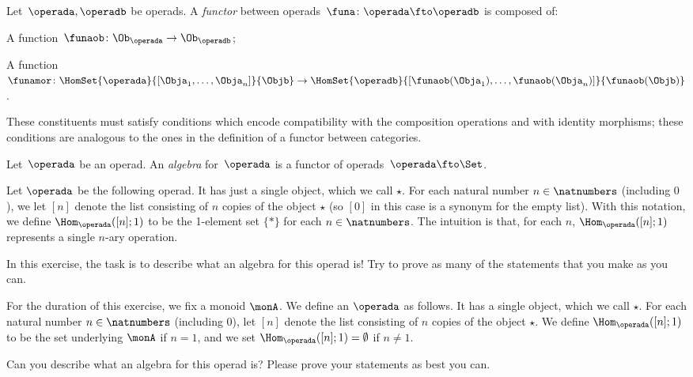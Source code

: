 \begin{ctdefinition}
  \label{def:functors_operads}
  Let~$\operada,\operadb$ be operads. A \emph{functor} between operads~$\funa\colon \operada \fto \operadb$  is composed of:
  \begin{compactenum}
    \item A function~$\funaob\colon \Ob_\operada\to \Ob_\operadb$;
    \item A function~$\funamor\colon \HomSet{\operada}{[\Obja_1,\ldots,\Obja_n]}{\Objb}\to \HomSet{\operadb}{[\funaob(\Obja_1),\ldots, \funaob(\Obja_n)]}{\funaob(\Objb)}$.
  \end{compactenum}
  These constituents must satisfy conditions which encode compatibility with the composition operations and with identity morphisms; these conditions are analogous to the ones in the definition of a functor between categories.
\end{ctdefinition}

\begin{definition}
  \label{def:algebra_operad}
  Let~$\operada$ be an operad. An \emph{algebra} for~$\operada$ is a functor of operads~$\operada \fto \Set$.
\end{definition}

\begin{gradedexercise}\label{ex:MonoidsAsAlgebras}
Let $\operada$ be the following operad. It has just a single object, which we call $\star$.  For each natural number $n \in \natnumbers$ (including $0$), we let $[n]$ denote the list consisting of $n$ copies of the object $\star$ (so $[0]$ in this case is a synonym for the empty list). With this notation, we define $\Hom_\operada([n];1)$ to be the 1-element set $\{ * \}$ for each $n \in \natnumbers$. The intuition is that, for each $n$, $\Hom_\operada([n];1)$ represents a single $n$-ary operation.

In this exercise, the task is to describe what an algebra for this operad is! Try to prove as many of the statements that you make as you can.
\end{gradedexercise}

\begin{gradedexercise}\label{ex:MonoidsActionsAsAlgebras}
For the duration of this exercise, we fix a monoid $\monA$.
We define an $\operada$ as follows. It has a single object, which we call $\star$.  For each natural number $n \in \natnumbers$ (including $0$), let $[n]$ denote the list consisting of $n$ copies of the object $\star$. We define $\Hom_\operada([n];1)$ to be the set underlying $\monA$ if $n =1$, and we set $\Hom_\operada([n];1) = \emptyset$ if $n \neq 1$.

Can you describe what an algebra for this operad is?  Please prove your statements as best you can.
\end{gradedexercise}






